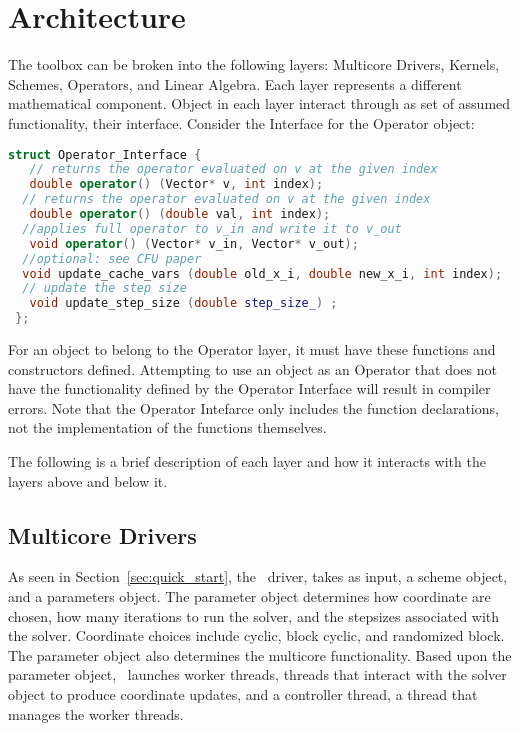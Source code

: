 \section{Architecture}

The toolbox can be broken into the following layers: Multicore Drivers, Kernels, Schemes, Operators, and Linear Algebra.
Each layer represents a different mathematical component. 
Object in each layer interact through as set of assumed functionality, their interface.
Consider the Interface for the Operator object:

\begin{lstlisting}[language=C++,label={Operator_Interface}]
struct Operator_Interface {
   // returns the operator evaluated on v at the given index
   double operator() (Vector* v, int index);
  // returns the operator evaluated on v at the given index
   double operator() (double val, int index);
  //applies full operator to v_in and write it to v_out
   void operator() (Vector* v_in, Vector* v_out);
  //optional: see CFU paper
  void update_cache_vars (double old_x_i, double new_x_i, int index);
  // update the step size
   void update_step_size (double step_size_) ;
 };
\end{lstlisting}

For an object to belong to the Operator layer, it must have these functions and constructors defined.
Attempting to use an object as an Operator that does not have the functionality defined by the Operator Interface will result in compiler errors.
Note that the Operator Intefarce only includes the function declarations, not the implementation of the functions themselves.

The following is a brief description of each layer and how it interacts with the layers above and below it.

\subsection{Multicore Drivers}

As seen in Section~\ref{sec:quick_start}, the \pkg~driver, takes as input, a scheme object, and a parameters object.
The parameter object determines how coordinate are chosen, how many iterations to run the solver, and the stepsizes associated with the solver.
Coordinate choices include cyclic, block cyclic, and randomized block.
The parameter object also determines the multicore functionality. 
Based upon the parameter object, \pkg~launches worker threads, threads that interact with the solver object to produce coordinate updates, and a controller thread, a thread that manages the worker threads.
  

